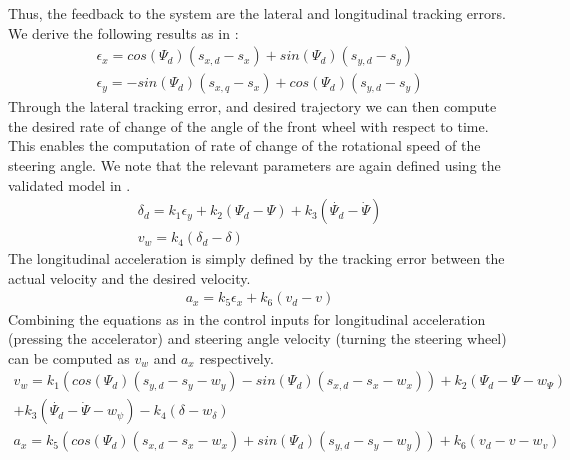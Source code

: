 Thus, the feedback to the system are the lateral and longitudinal tracking errors. We derive the following results as in  \cite{Snider2009}:
\begin{gather*}
\epsilon_x=cos{(\Psi_d)}(s_{x,d}-s_x) +sin{(\Psi_d)}(s_{y,d}-s_y)
\\
\epsilon_y=-sin{(\Psi_d)}(s_{x,q}-s_x)+cos{(\Psi_d)}(s_{y,d}-s_y)
\end{gather*}
Through the lateral tracking error, and desired trajectory we can then compute the desired rate of change of the angle of the front wheel with respect to time. This enables the computation of rate of change of the rotational speed of the steering angle. We note that the relevant parameters are again defined using the validated model in \cite{Althoff2014}.
\begin{gather*}
\delta_d=k_1 \epsilon_y+k_2(\Psi_d-\Psi)+ k_3(\dot{\Psi_d}-\dot{\Psi})
\\
v_w=k_4(\delta_d-\delta)
\end{gather*}
The longitudinal acceleration is simply defined by the tracking error between the actual velocity and the desired velocity.
\begin{gather*}
a_x=k_5\epsilon_x+k_6(v_d-v)
\end{gather*}
Combining the equations as in \cite{Althoff2014} the control inputs for longitudinal acceleration (pressing the accelerator) and steering angle velocity (turning the steering wheel) can be computed as $v_w$ and $a_x$ respectively. 
\begin{gather*}
v_w=k_1(cos{(\Psi_d)}(s_{y,d}-s_y-w_y)-sin{(\Psi_d)}(s_{x,d}-s_x-w_x))+k_2(\Psi_d-\Psi-w_{\Psi})\\ +k_3(\dot{\Psi_d}-\dot{\Psi}-w_{\psi})-k_4(\delta-w_{\delta})
\\
a_x=k_5(cos{(\Psi_d)}(s_{x,d}-s_x-w_x)+sin{(\Psi_d)}(s_{y,d}-s_y-w_y))+k_6(v_d-v-w_v)
\end{gather*}

